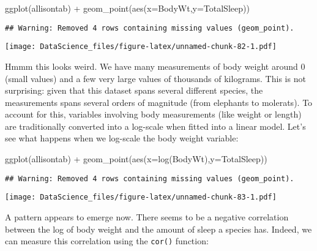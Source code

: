 \documentclass[
]{book}
\newenvironment{Shaded}{\begin{snugshade}}{\end{snugshade}}
\newcommand{\AttributeTok}[1]{\textcolor[rgb]{0.77,0.63,0.00}{#1}}
\newcommand{\FunctionTok}[1]{\textcolor[rgb]{0.00,0.00,0.00}{#1}}
\newcommand{\NormalTok}[1]{#1}
\newcommand{\SpecialCharTok}[1]{\textcolor[rgb]{0.00,0.00,0.00}{#1}}
\newcommand{\StringTok}[1]{\textcolor[rgb]{0.31,0.60,0.02}{#1}}
\begin{document}
\begin{Shaded}
\begin{Highlighting}[]
\FunctionTok{ggplot}\NormalTok{(allisontab) }\SpecialCharTok{+} \FunctionTok{geom\_point}\NormalTok{(}\FunctionTok{aes}\NormalTok{(}\AttributeTok{x=}\NormalTok{BodyWt,}\AttributeTok{y=}\NormalTok{TotalSleep))}
\end{Highlighting}
\end{Shaded}

\begin{verbatim}
## Warning: Removed 4 rows containing missing values (geom_point).
\end{verbatim}

\texttt{[image: DataScience\_files/figure-latex/unnamed-chunk-82-1.pdf]}

Hmmm this looks weird. We have many measurements of body weight around 0 (small values) and a few very large values of thousands of kilograms. This is not surprising: given that this dataset spans several different species, the measurements spans several orders of magnitude (from elephants to molerats). To account for this, variables involving body measurements (like weight or length) are traditionally converted into a log-scale when fitted into a linear model. Let's see what happens when we log-scale the body weight variable:

\begin{Shaded}
\begin{Highlighting}[]
\FunctionTok{ggplot}\NormalTok{(allisontab) }\SpecialCharTok{+} \FunctionTok{geom\_point}\NormalTok{(}\FunctionTok{aes}\NormalTok{(}\AttributeTok{x=}\FunctionTok{log}\NormalTok{(BodyWt),}\AttributeTok{y=}\NormalTok{TotalSleep))}
\end{Highlighting}
\end{Shaded}

\begin{verbatim}
## Warning: Removed 4 rows containing missing values (geom_point).
\end{verbatim}

\texttt{[image: DataScience\_files/figure-latex/unnamed-chunk-83-1.pdf]}

A pattern appears to emerge now. There seems to be a negative correlation between the log of body weight and the amount of sleep a species has. Indeed, we can measure this correlation using the \texttt{cor()} function:

\begin{Shaded}
\end{Shaded}
\end{document}
